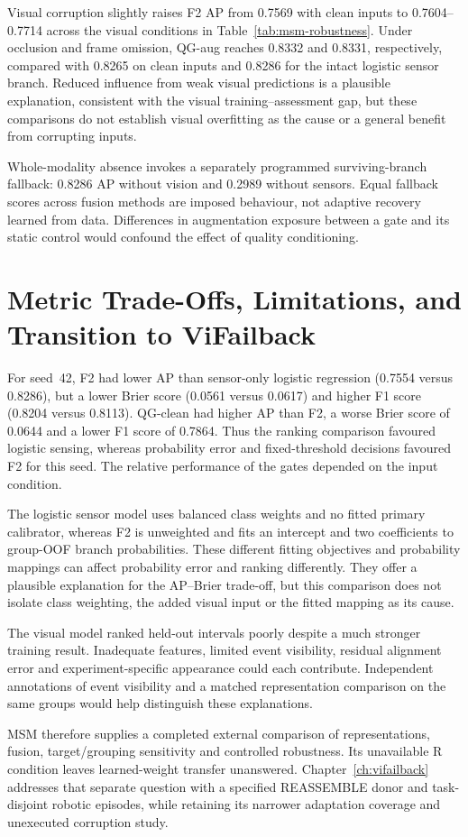 Visual corruption slightly raises F2 AP from 0.7569 with clean inputs to
0.7604--0.7714 across the visual conditions in Table~\ref{tab:msm-robustness}.
Under occlusion and frame omission, QG-aug reaches 0.8332 and 0.8331, respectively,
compared with 0.8265 on clean inputs and 0.8286 for the intact logistic sensor branch.
Reduced influence from weak visual predictions is a plausible explanation, consistent
with the visual training--assessment gap, but these comparisons do not establish
visual overfitting as the cause or a general benefit from corrupting inputs.

Whole-modality absence invokes a separately programmed surviving-branch fallback:
0.8286 AP without vision and 0.2989 without sensors. Equal fallback scores across
fusion methods are imposed behaviour, not adaptive recovery learned from data.
Differences in augmentation exposure between a gate and its static control would
confound the effect of quality conditioning.

\section{Metric Trade-Offs, Limitations, and Transition to ViFailback}
For seed~42, F2 had lower AP than sensor-only logistic regression (0.7554 versus
0.8286), but a lower Brier score (0.0561
versus 0.0617) and higher F1 score (0.8204 versus 0.8113). QG-clean had higher AP than
F2, a worse Brier score of 0.0644 and a lower F1 score of 0.7864. Thus the ranking
comparison favoured logistic sensing, whereas probability error and fixed-threshold
decisions favoured F2 for this seed. The relative performance of the gates depended on
the input condition.

The logistic sensor model uses balanced class weights and no fitted primary calibrator,
whereas F2 is unweighted and fits an intercept and two coefficients to group-OOF branch
probabilities. These different fitting objectives and probability mappings can affect
probability error and ranking differently. They offer a plausible explanation for the
AP--Brier trade-off, but this comparison does not isolate class weighting, the added
visual input or the fitted mapping as its cause.

The visual model ranked held-out intervals poorly despite a much stronger training
result. Inadequate features, limited event visibility, residual alignment error and
experiment-specific appearance could each contribute. Independent annotations of event
visibility and a matched representation comparison on the same groups would help
distinguish these explanations.

MSM therefore supplies a completed external comparison of representations, fusion,
target/grouping sensitivity and controlled robustness. Its unavailable R condition
leaves learned-weight transfer unanswered. Chapter~\ref{ch:vifailback} addresses that
separate question with a specified REASSEMBLE donor and task-disjoint robotic episodes,
while retaining its narrower adaptation coverage and unexecuted corruption study.
